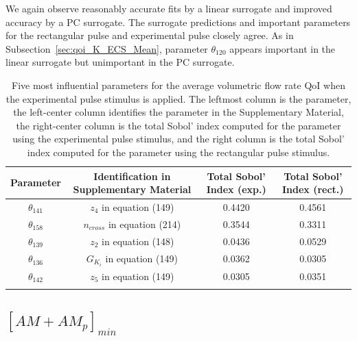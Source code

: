 \documentclass[smallextended]{svjour3}
\newcommand{\ra}[1]{\renewcommand{\arraystretch}{#1}}
\numberwithin{equation}{section}
\begin{document}
We again observe reasonably accurate fits by a linear surrogate and improved accuracy by a PC surrogate. The surrogate predictions and important parameters for the rectangular pulse and experimental pulse closely agree.  As in Subsection~\ref{sec:qoi_K_ECS_Mean}, parameter $\theta_{120}$ appears important in the linear surrogate but unimportant in the PC surrogate.

\begin{table}[h]
\centering
\ra{1.3}
\begin{tabular}{cccc}
\toprule
Parameter & Identification in Supplementary Material & Total Sobol' Index (exp.) & Total Sobol' Index (rect.) \\
\midrule
$\theta_{141}$ &  $z_4$ in equation (149)  & 0.4420 & 0.4561\\
$\theta_{158}$ & $n_{cross}$ in equation (214)   & 0.3544 & 0.3311\\ 
 $\theta_{139}$ & $z_2$ in equation (148)  & 0.0436 & 0.0529\\
$\theta_{136}$ & $G_{K_i}$ in equation (149)   & 0.0362 & 0.0305\\
$\theta_{142}$ & $z_5$ in equation (149)   &  0.0305 & 0.0351\\
   \arrayrulecolor{black}\bottomrule
\end{tabular}
\caption{Five most influential parameters for the average volumetric flow rate QoI when the experimental pulse stimulus is applied. The leftmost column is the parameter, the left-center column identifies the parameter in the Supplementary Material, the right-center column is the total Sobol' index computed for the parameter using the experimental pulse stimulus, and the right column is the total Sobol' index computed for the parameter using the rectangular pulse stimulus.}
\label{tab:qoi_vol_flow}
\end{table}

\subsection{$[AM+AM_p]_{min}$}
\end{document}
